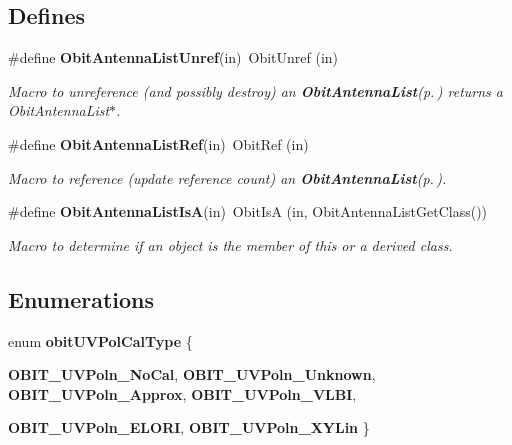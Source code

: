 \subsection*{Defines}
\begin{CompactItemize}
\item 
\#define {\bf Obit\-Antenna\-List\-Unref}(in)\ Obit\-Unref (in)
\begin{CompactList}\small\item\em Macro to unreference (and possibly destroy) an {\bf Obit\-Antenna\-List}{\rm (p.\,\pageref{structObitAntennaList})} returns a Obit\-Antenna\-List$\ast$. \item\end{CompactList}\item 
\#define {\bf Obit\-Antenna\-List\-Ref}(in)\ Obit\-Ref (in)
\begin{CompactList}\small\item\em Macro to reference (update reference count) an {\bf Obit\-Antenna\-List}{\rm (p.\,\pageref{structObitAntennaList})}. \item\end{CompactList}\item 
\#define {\bf Obit\-Antenna\-List\-Is\-A}(in)\ Obit\-Is\-A (in, Obit\-Antenna\-List\-Get\-Class())
\begin{CompactList}\small\item\em Macro to determine if an object is the member of this or a derived class. \item\end{CompactList}\end{CompactItemize}
\subsection*{Enumerations}
\begin{CompactItemize}
\item 
enum {\bf obit\-UVPol\-Cal\-Type} \{ \par
{\bf OBIT\_\-UVPoln\_\-No\-Cal}, 
{\bf OBIT\_\-UVPoln\_\-Unknown}, 
{\bf OBIT\_\-UVPoln\_\-Approx}, 
{\bf OBIT\_\-UVPoln\_\-VLBI}, 
\par
{\bf OBIT\_\-UVPoln\_\-ELORI}, 
{\bf OBIT\_\-UVPoln\_\-XYLin}
 \}
\end{CompactItemize}
